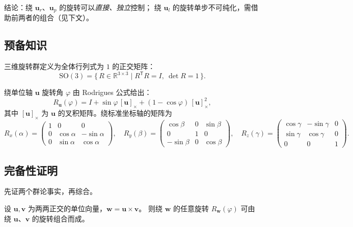 \noindent 结论：绕 $\mathbf{u}_r$、$\mathbf{u}_p$ 的旋转可以\emph{直接、独立}控制；
绕 $\mathbf{u}_l$ 的旋转单步不可纯化，需借助前两者的组合（见下文）。

\subsection{预备知识}

三维旋转群定义为全体行列式为 $1$ 的正交矩阵：
\begin{equation}
  \mathrm{SO}(3) = \{\, R \in \mathbb{R}^{3\times 3} \mid R^{\mathsf T}R = I,\ \det R = 1 \,\}.
\end{equation}

绕单位轴 $\mathbf{u}$ 旋转角 $\varphi$ 由 Rodrigues 公式给出：
\begin{equation}
  R_{\mathbf{u}}(\varphi)
  = I + \sin\varphi\, [\mathbf{u}]_{\times} + (1-\cos\varphi)\, [\mathbf{u}]_{\times}^{2},
\end{equation}
其中 $[\mathbf{u}]_{\times}$ 为 $\mathbf{u}$ 的叉积矩阵。绕标准坐标轴的矩阵为
\begin{equation}
  R_x(\alpha) =
  \begin{pmatrix} 1&0&0\\ 0&\cos\alpha&-\sin\alpha\\ 0&\sin\alpha&\cos\alpha \end{pmatrix},\quad
  R_y(\beta) =
  \begin{pmatrix} \cos\beta&0&\sin\beta\\ 0&1&0\\ -\sin\beta&0&\cos\beta \end{pmatrix},\quad
  R_z(\gamma) =
  \begin{pmatrix} \cos\gamma&-\sin\gamma&0\\ \sin\gamma&\cos\gamma&0\\ 0&0&1 \end{pmatrix}.
  \label{eq:rotmat}
\end{equation}

\subsection{完备性证明}

先证两个群论事实，再综合。

\begin{lemma}[绕两正交轴生成绕第三轴]
  设 $\mathbf{u},\mathbf{v}$ 为两两正交的单位向量，$\mathbf{w} = \mathbf{u}\times\mathbf{v}$。
  则绕 $\mathbf{w}$ 的任意旋转 $R_{\mathbf{w}}(\varphi)$ 可由绕 $\mathbf{u}$、$\mathbf{v}$
  的旋转组合而成。
\end{lemma}

